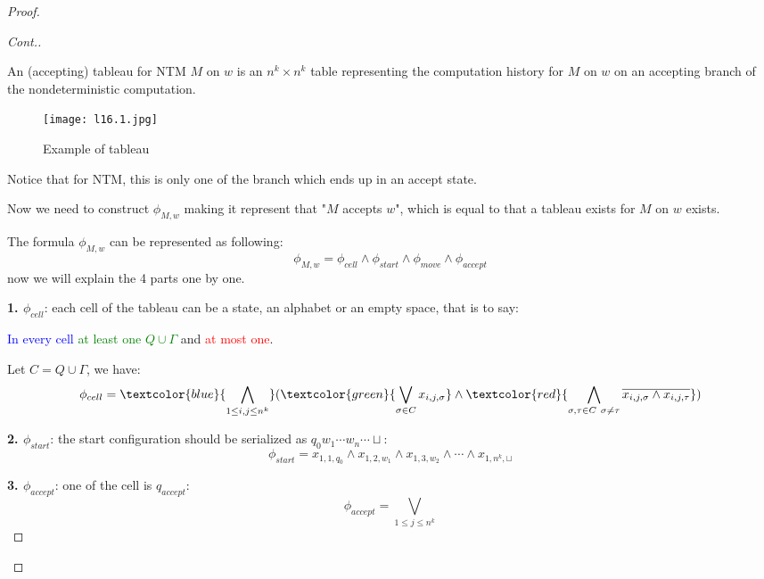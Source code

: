 \begin{proof}
\begin{proof}[Cont.]
        \begin{definition}[tableau]
            An (accepting) tableau for NTM \(M\) on \(w\) is an \(n^k \times n^k\) table representing the computation history for \(M\) on \(w\) on an accepting branch of the nondeterministic computation.     

            \begin{figure}[H]
               \centering 
               \texttt{[image: l16.1.jpg]}
               \caption{Example of tableau}
            \end{figure}

            Notice that for NTM, this is only one of the branch which ends up in an accept state.
        \end{definition}

        Now we need to construct \(\phi_{M,w}\)  making it represent that "\(M\) accepts \(w\)",
        which is equal to that a tableau exists for \(M\) on \(w\) exists.   

        The formula \(\phi_{M,w}\) can be represented as following:
        \[
            \phi_{M, w} = 
                \phi_{cell} \land 
                \phi_{start} \land
                \phi_{move} \land
                \phi_{accept}
        \] 
        now we will explain the 4 parts one by one.

        \textbf{1. \( \phi_{cell}\)}: each cell of the tableau can be a state, an alphabet or an empty space, that is to say:

        \textcolor{blue}{In every cell} \textcolor{green}{at least one \(Q \cup \Gamma\)} and \textcolor{red}{at most one}. 

        Let \(C = Q \cup \Gamma\), we have:
        \[
            \phi_{cell} = 
            \textcolor{blue}{\bigwedge_{1 \leq i,j\leq n^k}} (
                \textcolor{green}{\bigvee_{\sigma \in C} x_{i, j, \sigma}} 
                \land
                \textcolor{red}{\bigwedge_{\sigma, \tau \in C\ \sigma \neq \tau} \overline{x_{i,j, \sigma} \land x_{i, j, \tau}}}
                )
        \]

        \textbf{2. \(\phi_{start}\)}: the start configuration should be serialized as \(q_0 w_1 \cdots w_n \cdots \sqcup\):
        \[
            \phi_{start} = 
            x_{1, 1, q_0} \land 
            x_{1, 2, w_1} \land 
            x_{1, 3, w_2} \land
            \cdots \land
            x_{1, n^k, \sqcup}
        \]

        \textbf{3. \(\phi_{accept}\)}: one of the cell is \(q_{accept}\):
        \[
            \phi_{accept} = \bigvee_{1 \leq j \leq n^k}
        \] 


\end{proof}
\end{proof}
